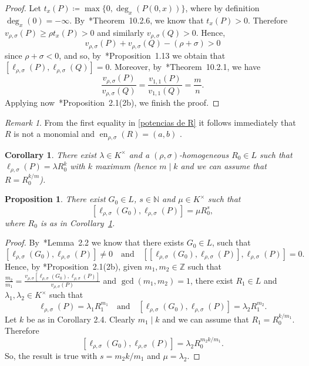\documentclass[reqno,a4paper]{amsart}
\newtheorem{proposition}[theorem]{Proposition}
\newtheorem{corollary}[theorem]{Corollary}
\theoremstyle{definition}
\theoremstyle{remark}
\newtheorem{remark}[theorem]{Remark}
\DeclareMathOperator{\en}{en}
\begin{document}
\begin{proof} Let $t_x(P)\coloneqq  \max \{0,\deg_x (P(0,x))\}$, where by definition $\deg_x(0)= -\infty$. By~\cite{vdE}*{Theorem~10.2.6}, we know that $t_x(P)>0$. Therefore $v_{\rho,\sigma}(P)\ge \rho t_x(P)>0$ and similarly $v_{\rho,\sigma}(Q)>0$. Hence,
$$
v_{\rho,\sigma}(P)+v_{\rho,\sigma}(Q)-(\rho+\sigma)>0
$$
since $\rho+\sigma<0$, and so, by~\cite{GGV}*{Proposition~1.13} we obtain that $[\ell_{\rho,\sigma}(P),\ell_{\rho,\sigma}(Q)]=0$. Moreover, by~\cite{vdE}*{Theorem~10.2.1}, we have
$$
\frac{v_{\rho,\sigma}(P)}{v_{\rho,\sigma}(Q)} = \frac{v_{1,1}(P)}{v_{1,1}(Q)} = \frac{m}{n}.
$$
Applying now~\cite{GGV}*{Proposition~2.1(2b)}, we finish the proof.
\end{proof}

\begin{remark}\label{en de R} From the first equality in \eqref{potencias de R} it follows immediately that $R$ is not a monomial and $\en_{\rho,\sigma}(R)=(a,b)$ .
\end{remark}

\begin{corollary}\label{R0} There exist $\lambda\in K^{\times}$ and a $(\rho,\sigma)$-homogeneous $R_0\in L$ such that $\ell_{\rho,\sigma}(P) = \lambda R_0^k$ with $k$ maximum (hence $m\mid k$ and we can assume that~$R=R_0^{k/m}$).
\end{corollary}

\begin{proposition}\label{corchete que da potencia de R0} There exist $G_0\in L$, $s\in \mathds{N}$ and $\mu\in K^{\times}$ such that
$$
[\ell_{\rho,\sigma}(G_0),\ell_{\rho,\sigma}(P)]=\mu R_0^s,
$$
where $R_0$ is as in Corollary~\ref{R0}.
\end{proposition}

\begin{proof} By~\cite{GGV}*{Lemma~2.2} we know that there exists $G_0\in L$, such that
$$
[\ell_{\rho,\sigma}(G_0),\ell_{\rho,\sigma}(P)]\ne 0 \quad\text{and}\quad [[\ell_{\rho,\sigma}(G_0),\ell_{\rho,\sigma}(P)],\ell_{\rho,\sigma}(P)]=0.
$$
Hence, by \cite{GGV}*{Proposition~2.1(2b)}, given $m_1,m_2\in \mathds{Z}$ such that $\frac{m_2}{m_1}=\frac{v_{\rho,\sigma}[\ell_{\rho,\sigma} (G_0),\ell_{\rho,\sigma}(P)]} {v_{\rho,\sigma}(P)}$ and $\gcd(m_1,m_2)=1$, there exist $R_1\in L$ and $\lambda_1,\lambda_2\in K^{\times}$ such that
$$
\ell_{\rho,\sigma}(P) = \lambda_1 R_1^{m_1} \quad\text{and}\quad [\ell_{\rho,\sigma}(G_0),\ell_{\rho,\sigma}(P)] = \lambda_2 R_1^{m_2}.
$$
Let $k$ be as in Corollary 2.4. Clearly $m_1\mid k$ and we can assume that $R_1 = R_0^{k/m_1}$. Therefore
$$
[\ell_{\rho,\sigma}(G_0),\ell_{\rho,\sigma}(P)] = \lambda_2 R_0^{m_2k/m_1}.
$$
So, the result is true with $s= m_2k/m_1$ and $\mu=\lambda_2$.
\end{proof}
\end{document}
